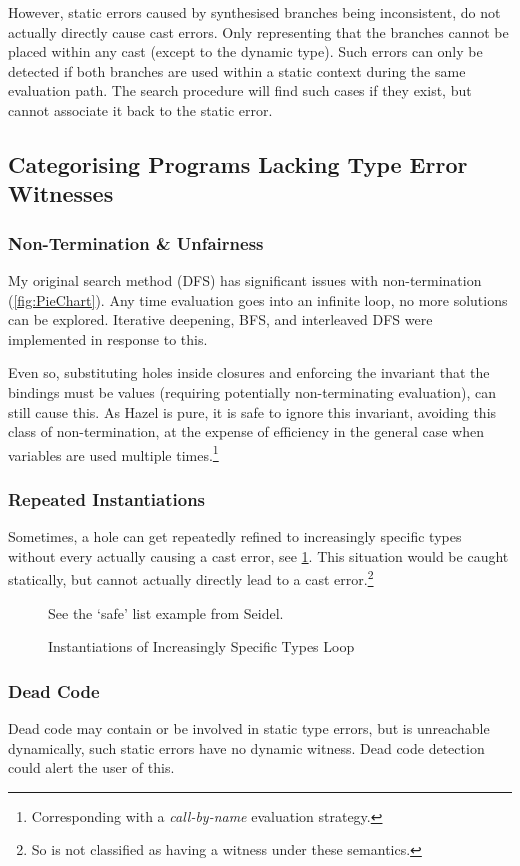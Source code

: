 However, static errors caused by synthesised branches being inconsistent, do not actually directly cause cast errors. Only representing that the branches cannot be placed within any cast (except to the dynamic type). Such errors can only be detected if both branches are used within a static context during the same evaluation path. The search procedure will find such cases if they exist, but cannot associate it back to the static error.
  
\subsection{Categorising Programs Lacking Type Error Witnesses}
\label{sec:SearchCategories}
\subsubsection{Non-Termination \& Unfairness}
My original search method (DFS) has significant issues with non-termination (\cref{fig:PieChart}). Any time evaluation goes into an infinite loop, no more solutions can be explored. Iterative deepening, BFS, and interleaved DFS were implemented in response to this.

Even so, substituting holes inside closures and enforcing the invariant that the bindings must be values (requiring potentially non-terminating evaluation), can still cause this. As Hazel is pure, it is safe to ignore this invariant, avoiding this class of non-termination, at the expense of efficiency in the general case when variables are used multiple times.\footnote{Corresponding with a \textit{call-by-name} evaluation strategy.}

\subsubsection{Repeated Instantiations}
Sometimes, a hole can get repeatedly refined to increasingly specific types without every actually causing a cast error, see \cref{fig:InfiniteInstantiations}. This situation would be caught statically, but cannot actually directly lead to a cast error.\footnote{So is not classified as having a witness under these semantics.} 

\begin{figure}[h]
\centering
See the `safe' list example from Seidel.
\caption{Instantiations of Increasingly Specific Types Loop}
\label{fig:InfiniteInstantiations}
\end{figure}

\subsubsection{Dead Code}
Dead code may contain or be involved in static type errors, but is unreachable dynamically, such static errors have no dynamic witness. Dead code detection \cite{DeadCodeDetection} could alert the user of this.

